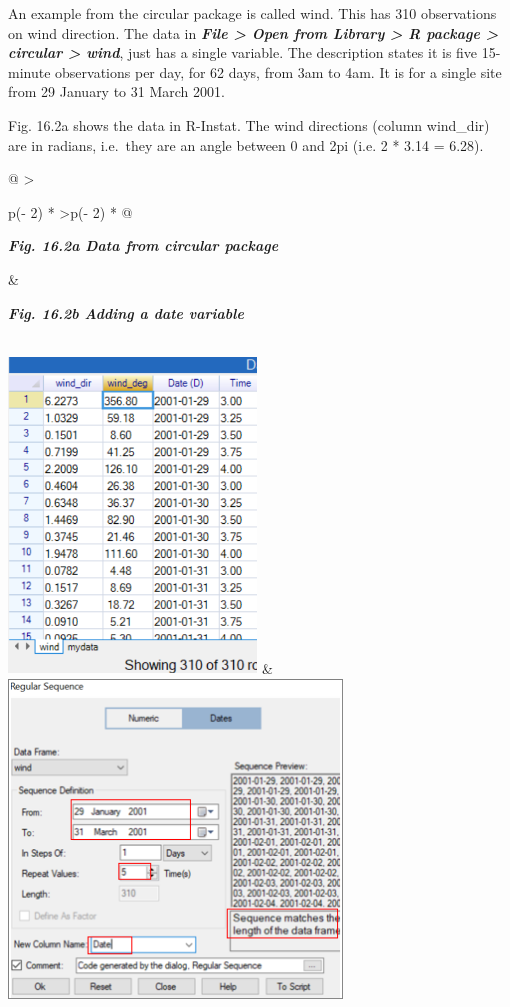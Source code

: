 \documentclass[
  letterpaper,
  DIV=11,
  numbers=noendperiod]{scrreprt}
\begin{document}
An example from the circular package is called wind. This has 310
observations on wind direction. The data in \textbf{\emph{File
\textgreater{} Open from Library \textgreater{} R package \textgreater{}
circular \textgreater{} wind}}, just has a single variable. The
description states it is five 15-minute observations per day, for 62
days, from 3am to 4am. It is for a single site from 29 January to 31
March 2001.

Fig. 16.2a shows the data in R-Instat. The wind directions (column
wind\_dir) are in radians, i.e.~they are an angle between 0 and 2pi
(i.e. 2 * 3.14 = 6.28).

\begin{longtable}[]{@{}
  >{\raggedright\arraybackslash}p{(\columnwidth - 2\tabcolsep) * }
  >{\raggedleft\arraybackslash}p{(\columnwidth - 2\tabcolsep) * }@{}}
\toprule\noalign{}
\begin{minipage}[b]{\linewidth}\raggedright
\textbf{\emph{Fig. 16.2a Data from circular package}}
\end{minipage} & \begin{minipage}[b]{\linewidth}\raggedleft
\textbf{\emph{Fig. 16.2b Adding a date variable}}
\end{minipage} \\
\midrule\noalign{}
\endhead
\bottomrule\noalign{}
\endlastfoot
\includegraphics[width=2.59665in,height=3.29892in]{figures/Fig16.2a.png}
&
\includegraphics[width=3.48868in,height=3.35703in]{figures/Fig16.2b.png} \\
\end{longtable}
\end{document}
